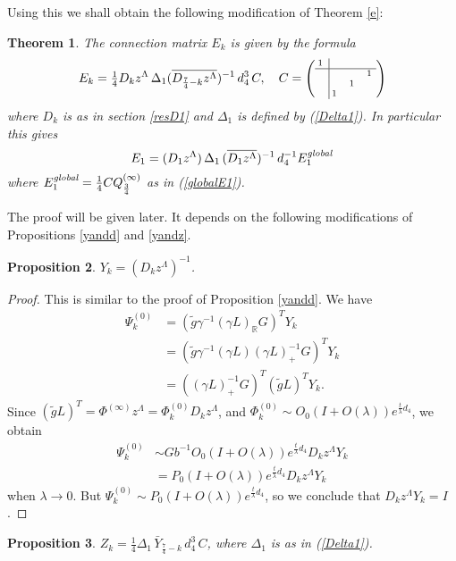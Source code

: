 \documentclass[a4paper,12pt,leqno]{amsart}
\numberwithin{equation}{section}
\theoremstyle{plain}
\newtheorem{theorem}{Theorem}[section]
\newtheorem{proposition}[theorem]{Proposition}
\theoremstyle{definition}
\newcommand{\R}{\mathbb R}
\newcommand{\la}{\lambda}
\newcommand{\De}{\Delta}
\newcommand{\Psiz}{  \Psi^{(0)}  }
\newcommand{\Qi}{  Q^{(\infty)}  }
\newcommand{\Phiz}{\Phi^{(0)}}
\newcommand{\Phii}{\Phi^{(\infty)}}
\newcommand{\MM}{\Lambda}
\newcommand{\gazi}{\gamma}
\begin{document}
{Using this we shall obtain the following modification of Theorem \ref{e}:

\begin{theorem}\label{Re}  The connection matrix $E_k$ is given by the formula   
\[
E_k=\tfrac14 D_k z^\MM\, 
\De_1 
(\overline{D_{\frac74-k}z^\MM})^{-1}\,
d_4^3\,  C, 
\quad
{\scriptsize
C=
\left(
\begin{array}{c|ccc}
\!\!1 & & & \\
\hline
 & & & 1\!\\
 & & 1 & \\
 & \!\!1 & &
\end{array}
\right)
}
\]
where $D_k$ is as in section \ref{resD1} and
$\De_1$ is defined by (\ref{Delta1}).
In particular this gives
\[
E_1= (D_1z^\MM)\, \De_1\, (\overline{D_1z^\MM})^{-1}\,d_4^{-1}E_1^{\text{\em global}}
\]
where $E_1^{\text{\em global}} = \tfrac14C \Qi_{\frac34}$ as in 
(\ref{globalE1}). 
\end{theorem}

The proof will be given later.  It depends on the following modifications of Propositions \ref{yandd} and \ref{yandz}.

\begin{proposition}\label{Ryandd}
$Y_k= (D_kz^\MM)^{-1}$.
\end{proposition}

\begin{proof}  This is similar to the proof of Proposition \ref{yandd}.  
We have
\begin{align*}
\Psiz_k&=(\tilde g \gazi^{-1} (\gazi L)_\R  G)^T Y_k
\\
&=(\tilde g \gazi^{-1} (\gazi L) (\gazi L)_+^{-1} G)^T Y_k
\\
&=((\gazi L)_+^{-1} G)^T (\tilde g L)^T Y_k.
\end{align*}
Since $(\tilde g L)^T = \Phii z^\MM = \Phiz_k D_k z^\MM$, and 
$\Phiz_k \sim  O_0 (I+O(\la) ) e^{\frac t\la d_4}$, we obtain
\begin{align*}
\Psiz_k  &\sim Gb^{-1} O_0  (I+O(\la) ) e^{\frac t\la d_4} D_k z^\MM Y_k
\\
&= P_0  (I+O(\la) ) e^{\frac t\la d_4} D_k z^\MM Y_k
\end{align*}
when $\la\to 0$.
But $\Psiz_k\sim P_0 (I+O(\la) ) e^{\frac t\la d_4}$, 
so we conclude that $D_k  z^\MM Y_k=I$.
\end{proof}

\begin{proposition}\label{Ryandz}  
$Z_k= \tfrac14 \De_1\, \bar Y_{\frac74-k}\, d_4^3\, C$,
where $\De_1$ is as in (\ref{Delta1}).
\end{proposition} 

}
\end{document}

